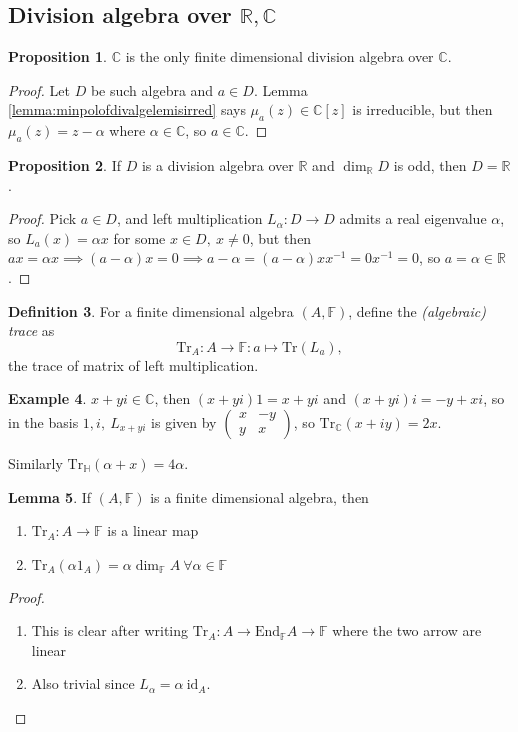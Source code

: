 \documentclass[a4paper]{article}
\newcommand{\Tr}{\text{Tr}}
\newcommand{\F}{\mathbb{F}}
\newcommand{\R}{\mathbb{R}}
\newcommand{\C}{\mathbb{C}}
\newcommand{\Hq}{\mathbb{H}}
\newcommand{\End}{\text{End}}
\newcommand{\id}{\text{id}}
\theoremstyle{definition}
\newtheorem{defn}{Definition}[subsection]
\newtheorem{prop}[defn]{Proposition}
\newtheorem{lemma}[defn]{Lemma}
\newtheorem{example}[defn]{Example}
\begin{document}
\subsection{Division algebra over $\R,\C$}
\begin{prop}
\label{prop:CisonlyfindimdivalgoverC}
$\C$ is the only finite dimensional division algebra over $\C$.
\end{prop}
\begin{proof}
Let $D$ be such algebra and $a\in D$. Lemma \ref{lemma:minpolofdivalgelemisirred} says $\mu_a(z)\in\C[z]$ is irreducible, but then $\mu_a(z)=z-\alpha$ where $\alpha\in\C$, so $a\in\C$.
\end{proof}

\begin{prop}
\label{prop:odddimdivalgoverRisR}
If $D$ is a division algebra over $\R$ and $\dim_\R D$ is odd, then $D=\R$.
\end{prop}
\begin{proof}
Pick $a\in D$, and left multiplication $L_\alpha:D\rightarrow D$ admits a real eigenvalue $\alpha$, so $L_a(x)=\alpha x$ for some $x\in D,\ x\neq 0$, but then $ax=\alpha x\implies (a-\alpha)x=0\implies a-\alpha=(a-\alpha)xx^{-1}=0x^{-1}=0$, so $a=\alpha\in\R$.
\end{proof}

\begin{defn}
For a finite dimensional algebra $(A,\F)$, define the \textit{(algebraic) trace} as
\[
\Tr_A:A\rightarrow\F:a\mapsto\Tr(L_a),
\]
the trace of matrix of left multiplication.
\end{defn}
\begin{example}
$x+yi\in\C$, then $(x+yi)1=x+yi$ and $(x+yi)i=-y+xi$, so in the basis $1,i,\ L_{x+yi}$ is given by $\begin{pmatrix}x&-y\\y&x\end{pmatrix}$, so $\Tr_\C(x+iy)=2x$.

Similarly $\Tr_\Hq(\alpha+x)=4\alpha$.
\end{example}

\begin{lemma}
If $(A,\F)$ is a finite dimensional algebra, then
\begin{enumerate}
\item $\Tr_A:A\rightarrow\F$ is a linear map
\item $\Tr_A(\alpha1_A)=\alpha\dim_\F A \ \forall\alpha\in\F$
\end{enumerate}
\end{lemma}
\begin{proof}
\begin{enumerate}
\item This is clear after writing $\Tr_A:A\rightarrow\End_\F A\rightarrow\F$ where the two arrow are linear
\item Also trivial since $L_\alpha=\alpha \ \id_A$.
\end{enumerate}
\end{proof}
\end{document}
